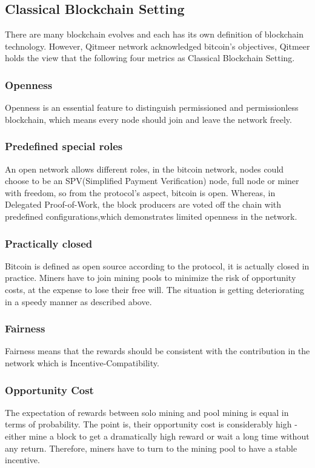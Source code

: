 \documentclass[a4paper,11pt]{article}
\begin{document}
\subsection{Classical Blockchain Setting}
There are many blockchain evolves and each has its own definition of blockchain technology. However, Qitmeer network acknowledged  bitcoin’s objectives, Qitmeer holds the view that the following four metrics as Classical Blockchain Setting.

\subsubsection{Openness}
Openness is an essential feature to distinguish permissioned and permissionless blockchain, which means every node should join and leave the network freely.


\subsubsection*{Predefined special roles}
An open network allows different roles, in the bitcoin network, nodes could choose to be an SPV(Simplified Payment Verification) node, full node or miner with freedom, so from the protocol’s aspect, bitcoin is open. Whereas, in Delegated Proof-of-Work, the block producers are voted off the chain with predefined  configurations,which demonstrates limited openness in the network.

\subsubsection*{Practically closed}
Bitcoin is defined as open source according to the protocol, it is actually closed in practice. Miners have to join mining pools to minimize the risk of opportunity costs, at the expense to lose their free will. The situation is getting deteriorating in a speedy manner as described above. 


\subsubsection{Fairness}
Fairness means that the rewards should be consistent with the contribution in the network which is Incentive-Compatibility.

\subsubsection*{Opportunity Cost}
The expectation of rewards between solo mining and pool mining is equal in terms of probability. The point is, their opportunity cost is considerably high - either mine a block to get a dramatically high reward or wait a long time without any return. Therefore, miners have to turn to the mining pool to have a stable incentive.
\end{document}

